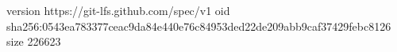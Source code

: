 version https://git-lfs.github.com/spec/v1
oid sha256:0543ea783377ceac9da84e440e76c84953ded22de209abb9caf37429febc8126
size 226623
